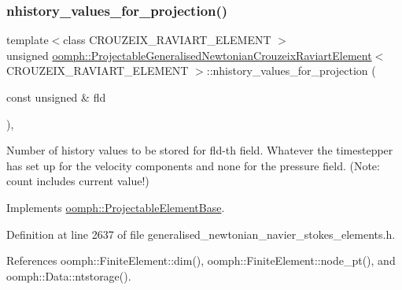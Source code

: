 \subsubsection{\texorpdfstring{nhistory\+\_\+values\+\_\+for\+\_\+projection()}{nhistory\_values\_for\_projection()}}
{\footnotesize\ttfamily template$<$class C\+R\+O\+U\+Z\+E\+I\+X\+\_\+\+R\+A\+V\+I\+A\+R\+T\+\_\+\+E\+L\+E\+M\+E\+NT $>$ \\
unsigned \hyperlink{classoomph_1_1ProjectableGeneralisedNewtonianCrouzeixRaviartElement}{oomph\+::\+Projectable\+Generalised\+Newtonian\+Crouzeix\+Raviart\+Element}$<$ C\+R\+O\+U\+Z\+E\+I\+X\+\_\+\+R\+A\+V\+I\+A\+R\+T\+\_\+\+E\+L\+E\+M\+E\+NT $>$\+::nhistory\+\_\+values\+\_\+for\+\_\+projection (\begin{DoxyParamCaption}\item[{const unsigned \&}]{fld }\end{DoxyParamCaption})\hspace{0.3cm}{\ttfamily [inline]}, {\ttfamily [virtual]}}



Number of history values to be stored for fld-\/th field. Whatever the timestepper has set up for the velocity components and none for the pressure field. (Note\+: count includes current value!) 



Implements \hyperlink{classoomph_1_1ProjectableElementBase_ac6790f394630b964663281f8740f43a5}{oomph\+::\+Projectable\+Element\+Base}.



Definition at line 2637 of file generalised\+\_\+newtonian\+\_\+navier\+\_\+stokes\+\_\+elements.\+h.



References oomph\+::\+Finite\+Element\+::dim(), oomph\+::\+Finite\+Element\+::node\+\_\+pt(), and oomph\+::\+Data\+::ntstorage().

\mbox{\label{classoomph_1_1ProjectableGeneralisedNewtonianCrouzeixRaviartElement_af5fd14a52a74dead7b8e095cb8b20cdc}} 
